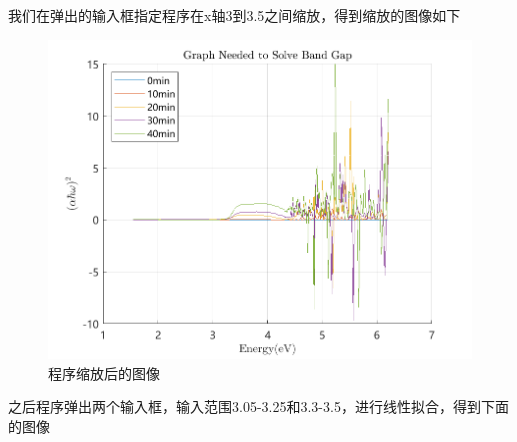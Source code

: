 \documentclass{ctexart}
\begin{document}
我们在弹出的输入框指定程序在x轴3到3.5之间缩放，得到缩放的图像如下

\begin{figure}[H]
  \centering
  \includegraphics[width=\linewidth]{禁带宽度数据处理程序/figures/graph_needed_to_solve_band_gap_zoomed/graph_needed_to_solve_band_gap_zoomed}
  \caption{程序缩放后的图像}
\end{figure}

之后程序弹出两个输入框，输入范围3.05-3.25和3.3-3.5，进行线性拟合，得到下面的图像
\end{document}
